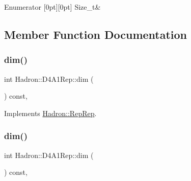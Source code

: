 \begin{DoxyEnumFields}{Enumerator}
[0pt][0pt]{}\mbox{\label{structHadron_1_1D4A1Rep_a5b6a6369d3795409de82b74da8b0c5d3a3cf2a8c71c879cfca394020d7c360d0e}} 
Size\+\_\+t&\\
\hline

\end{DoxyEnumFields}


\subsection{Member Function Documentation}
\mbox{\label{structHadron_1_1D4A1Rep_ae553df618a4dc5019fa2b0d1c43443b0}} 
\subsubsection{\texorpdfstring{dim()}{dim()}\hspace{0.1cm}{\footnotesize\ttfamily [1/3]}}
{\footnotesize\ttfamily int Hadron\+::\+D4\+A1\+Rep\+::dim (\begin{DoxyParamCaption}{ }\end{DoxyParamCaption}) const\hspace{0.3cm}{\ttfamily [inline]}, {\ttfamily [virtual]}}



Implements \mbox{\hyperlink{structHadron_1_1RepRep_a92c8802e5ed7afd7da43ccfd5b7cd92b}{Hadron\+::\+Rep\+Rep}}.

\mbox{\label{structHadron_1_1D4A1Rep_ae553df618a4dc5019fa2b0d1c43443b0}} 
\subsubsection{\texorpdfstring{dim()}{dim()}\hspace{0.1cm}{\footnotesize\ttfamily [2/3]}}
{\footnotesize\ttfamily int Hadron\+::\+D4\+A1\+Rep\+::dim (\begin{DoxyParamCaption}{ }\end{DoxyParamCaption}) const\hspace{0.3cm}{\ttfamily [inline]}, {\ttfamily [virtual]}}



